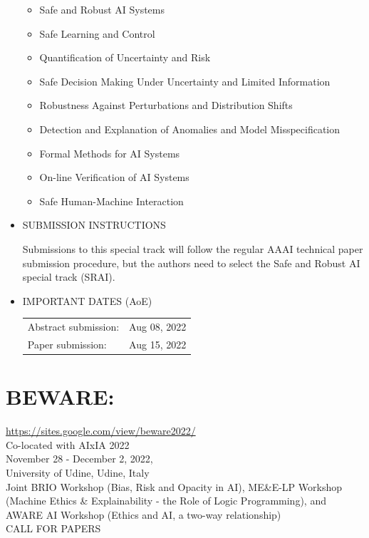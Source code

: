 \documentclass[prodmode,acmtecs]{acmsmall} %
\begin{document}
\begin{itemize}
\begin{itemize}\item  Safe and Robust AI Systems
\item  Safe Learning and Control
\item  Quantification of Uncertainty and Risk
\item  Safe Decision Making Under Uncertainty and Limited Information
\item  Robustness Against Perturbations and Distribution Shifts
\item  Detection and Explanation of Anomalies and Model Misspecification
\item  Formal Methods for AI Systems
\item  On-line Verification of AI Systems
\item  Safe Human-Machine Interaction
\end{itemize} 
\item  SUBMISSION INSTRUCTIONS  
 
  Submissions to this special track will follow the regular AAAI technical paper submission procedure, but the authors need to select the Safe and Robust AI special track (SRAI). 
 
\item  IMPORTANT DATES (AoE) 
 
\begin{tabulary}{\linewidth}{LL}Abstract submission:  & Aug 08, 2022 \\
Paper submission:  & Aug 15, 2022 \\
\end{tabulary}
 
\end{itemize}\section{BEWARE:}\label{BEWARE}  \href{https://sites.google.com/view/beware2022/}{https://sites.google.com/view/beware2022/}\\ 
  Co-located with AIxIA 2022\\ 
  November 28 - December 2, 2022,\\ 
  University of Udine, Udine, Italy\\ 
  Joint BRIO Workshop (Bias, Risk and Opacity in AI), ME\&E-LP Workshop (Machine Ethics \& Explainability - the Role of Logic Programming), and AWARE AI Workshop (Ethics and AI, a two-way relationship)\\ 
CALL FOR PAPERS 
\end{document}
